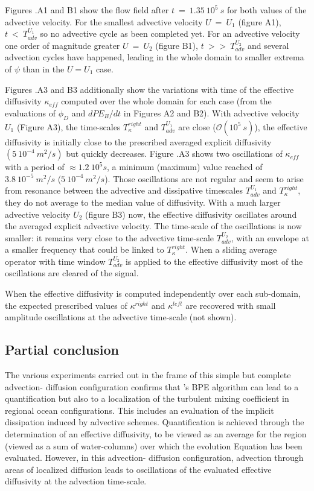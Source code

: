 Figures .A1 and B1 show the flow field after $t\ =\ 1.35\ 10^5 \ s$ for both values of the advective velocity. For the smallest advective velocity $U\ =\ U_1$ (figure A1), $t\ <\ T_{adv}^{U_1}$ so no advective cycle as been completed yet.
For an advective velocity one order of magnitude greater $U\ =\ U_2$ (figure B1), $t\ >>\ T_{adv}^{U_2}$ and several advection cycles have happened, leading in the whole domain to smaller extrema of $\psi$ than in the $U=U_1$ case.

Figures .A3 and B3 additionally show the variations with time of the effective diffusivity $\kappa_{eff}$ computed over the whole domain for each case (from the evaluations of $\phi_D$ and $dPE_B/dt$ in Figures A2 and B2). 
With advective velocity $U_1$ (Figure A3), the time-scales $T_{\kappa}^{right}$ and $T_{adv}^{U_1}$ are close ($\mathcal{O}(10^5\ s)$), the effective diffusivity is initially close to the prescribed averaged explicit diffusivity $(5 \ 10^{-4} \ m^2/s)$ but quickly decreases. Figure .A3 shows two oscillations of $\kappa_{eff}$ with a period of $\approx 1.2 \ 10^5s$, a minimum (maximum) value reached of $3.8 \ 10^{-5} \ m^2/s$ ($5 \ 10^{-4} \ m^2/s$). Those oscillations are not regular and seem to arise from resonance between the advective and dissipative timescales $T_{adv}^{U_1}$ and $T_{\kappa}^{right}$, they do not average to the median value of diffusivity.
With a much larger advective velocity $U_2$ (figure B3) now, the effective diffusivity oscillates around the averaged explicit advective velocity. The time-scale of the oscillations is now smaller: it remains very close to the advective time-scale $T_{adv}^{U_2}$, with an envelope at a smaller frequency that could be linked to $T_{\kappa}^{right}$. When a sliding average operator with time window $T_{adv}^{U_2}$ is applied to the effective diffusivity most of the oscillations are cleared of the signal.

When the effective diffusivity is computed independently over each sub-domain, the expected prescribed values of $\kappa^{right}$ and $\kappa^{left}$ are recovered with small amplitude oscillations at the advective time-scale (not shown).

\subsection{Partial conclusion}
The various experiments carried out in the frame of this simple but complete advection- diffusion configuration confirms that \cite{winters_available_1995}'s BPE algorithm can lead to a quantification but also to a localization of the turbulent mixing coefficient in regional ocean configurations. This includes an evaluation of the implicit dissipation induced by advective schemes.
Quantification is achieved through the determination of an effective diffusivity, to be
viewed as an average for the region (viewed as a sum of water-columns) over which the evolution Equation  has been evaluated. However, in this advection- diffusion configuration, advection through areas of localized diffusion leads to oscillations of the evaluated effective diffusivity at the advection time-scale. 

